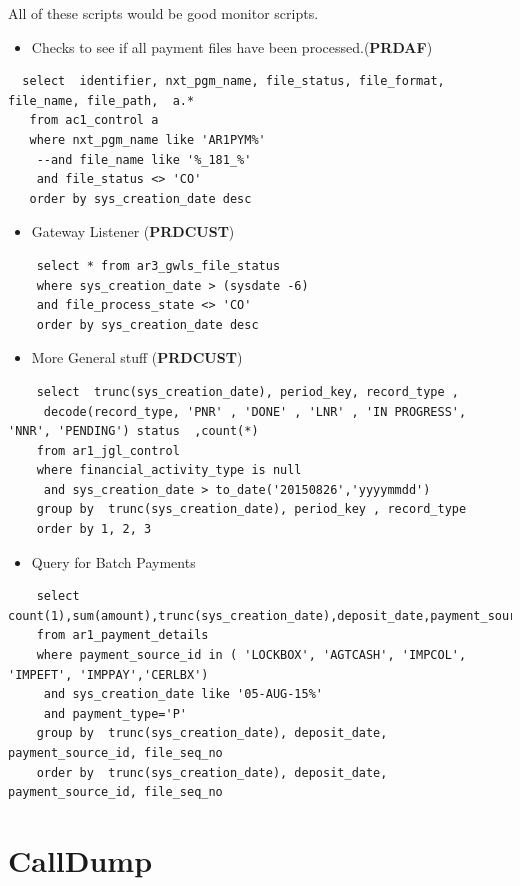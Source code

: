 \documentclass[12pt,twoside]{article}
\begin{document}
   All of these scripts would be good monitor scripts.
\begin{itemize}
\item Checks to see if all payment files have been processed.(\textbf{PRDAF})
\end{itemize}
\begin{verbatim}
  select  identifier, nxt_pgm_name, file_status, file_format, file_name, file_path,  a.* 
   from ac1_control a
   where nxt_pgm_name like 'AR1PYM%'
    --and file_name like '%_181_%'
    and file_status <> 'CO'
   order by sys_creation_date desc 
\end{verbatim}
\begin{itemize}
\item Gateway Listener (\textbf{PRDCUST})
\end{itemize}
\begin{verbatim}
    select * from ar3_gwls_file_status 
    where sys_creation_date > (sysdate -6)
    and file_process_state <> 'CO' 
    order by sys_creation_date desc
\end{verbatim}
\begin{itemize}
\item More General stuff (\textbf{PRDCUST})
\end{itemize}
\begin{verbatim}
    select  trunc(sys_creation_date), period_key, record_type , 
     decode(record_type, 'PNR' , 'DONE' , 'LNR' , 'IN PROGRESS', 'NNR', 'PENDING') status  ,count(*) 
    from ar1_jgl_control 
    where financial_activity_type is null  
     and sys_creation_date > to_date('20150826','yyyymmdd')
    group by  trunc(sys_creation_date), period_key , record_type
    order by 1, 2, 3  
\end{verbatim}
\begin{itemize}
\item Query for Batch Payments
\end{itemize}
\begin{verbatim}
    select count(1),sum(amount),trunc(sys_creation_date),deposit_date,payment_source_id,file_seq_no  
    from ar1_payment_details
    where payment_source_id in ( 'LOCKBOX', 'AGTCASH', 'IMPCOL', 'IMPEFT', 'IMPPAY','CERLBX')
     and sys_creation_date like '05-AUG-15%'
     and payment_type='P'
    group by  trunc(sys_creation_date), deposit_date, payment_source_id, file_seq_no
    order by  trunc(sys_creation_date), deposit_date, payment_source_id, file_seq_no
\end{verbatim}
\section{CallDump}
\label{sec-12}
\end{document}
